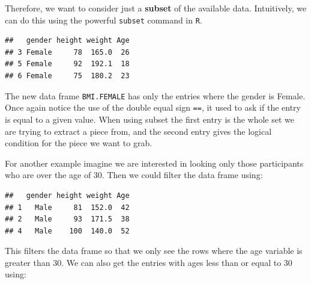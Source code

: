 \documentclass[
]{book}
\newenvironment{Shaded}{\begin{snugshade}}{\end{snugshade}}
\newcommand{\DecValTok}[1]{\textcolor[rgb]{0.00,0.00,0.81}{#1}}
\newcommand{\FunctionTok}[1]{\textcolor[rgb]{0.00,0.00,0.00}{#1}}
\newcommand{\NormalTok}[1]{#1}
\newcommand{\OtherTok}[1]{\textcolor[rgb]{0.56,0.35,0.01}{#1}}
\newcommand{\SpecialCharTok}[1]{\textcolor[rgb]{0.00,0.00,0.00}{#1}}
\newcommand{\StringTok}[1]{\textcolor[rgb]{0.31,0.60,0.02}{#1}}
\theoremstyle{definition}
\theoremstyle{definition}
\theoremstyle{definition}
\theoremstyle{definition}
\theoremstyle{remark}
\begin{document}
Therefore, we want to consider just a \textbf{subset} of the available data. Intuitively, we can do this using the powerful \texttt{subset} command in \texttt{R}.

\begin{Shaded}
\end{Shaded}

\begin{verbatim}
##   gender height weight Age
## 3 Female     78  165.0  26
## 5 Female     92  192.1  18
## 6 Female     75  180.2  23
\end{verbatim}

The new data frame \texttt{BMI.FEMALE} has only the entries where the gender is Female. Once again notice the use of the double equal sign \texttt{==}, it used to ask if the entry is equal to a given value. When using subset the first entry is the whole set we are trying to extract a piece from, and the second entry gives the logical condition for the piece we want to grab.

For another example imagine we are interested in looking only those participants who are over the age of 30. Then we could filter the data frame using:

\begin{Shaded}
\end{Shaded}

\begin{verbatim}
##   gender height weight Age
## 1   Male     81  152.0  42
## 2   Male     93  171.5  38
## 4   Male    100  140.0  52
\end{verbatim}

This filters the data frame so that we only see the rows where the age variable is greater than 30. We can also get the entries with ages less than or equal to 30 using:

\begin{Shaded}
\end{Shaded}
\end{document}
